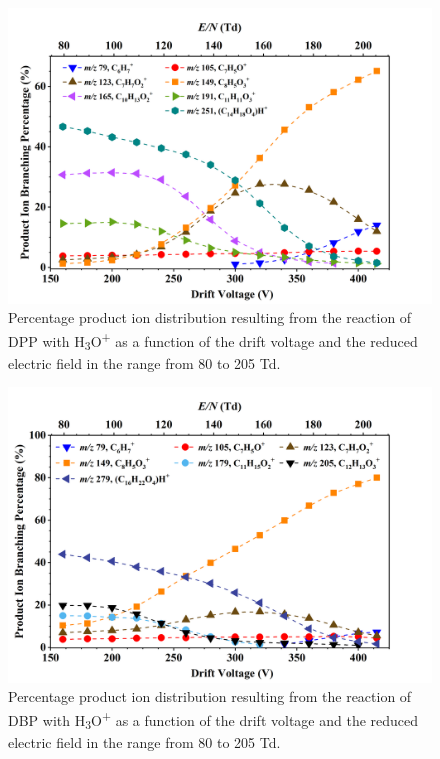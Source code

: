 \begin{figure}
\centering
\includegraphics[height=0.4\textheight]{pics/DPP-BR.png}
\caption{Percentage product ion distribution resulting from the reaction of DPP with H\textsubscript{3}O\textsuperscript{+} as a function of the drift voltage and the reduced electric field in the range from 80 to 205 Td.}
\label{fig:DPP_fs}
\end{figure}


\begin{figure}
\centering
\includegraphics[height=0.4\textheight]{pics/DBP-BR.png}
\caption{Percentage product ion distribution resulting from the reaction of DBP with H\textsubscript{3}O\textsuperscript{+} as a function of the drift voltage and the reduced electric field in the range from 80 to 205 Td.}
\label{fig:DBP_fs}
\end{figure}


